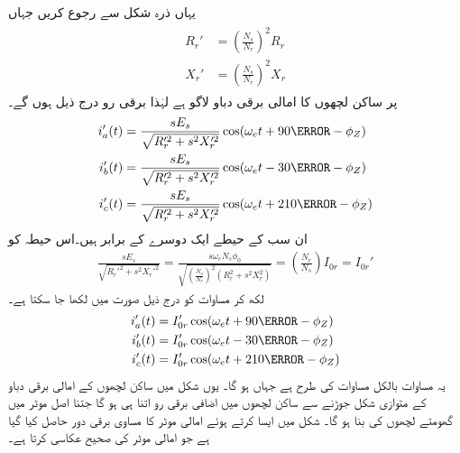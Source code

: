 یہاں ذرہ شکل   سے رجوع کریں جہاں 
\begin{gather}
\begin{aligned}\label{مساوات_امالی_گھومتے_مزاحمت_امالہ_دوسری_جانب}
R_r'&=\left(\frac{N_s}{N_r} \right)^2 R_r\\
X_r'&=\left(\frac{N_s}{N_r} \right)^2 X_r
\end{aligned}
\end{gather} 
پر ساکن لچھوں کا امالی برقی دباو  لاگو ہے لہٰذا  برقی رو درج ذیل ہوں گے۔
\begin{gather}
\begin{aligned}\label{مساوات_امالی_تین_رو}
i_a'(t)&=\frac{s E_s}{\sqrt{R_r'^2+s^2 X_r'^2}} \cos (\omega_e t +90\degree -\phi_Z)\\
i_b'(t)&=\frac{s E_s}{\sqrt{R_r'^2+s^2 X_r'^2}} \cos (\omega_e t -30\degree -\phi_Z)\\
i_c'(t)&=\frac{s E_s}{\sqrt{R_r'^2+s^2 X_r'^2}} \cos (\omega_e t +210\degree -\phi_Z)
\end{aligned}
\end{gather}
ان سب  کے حیطے ایک دوسرے کے برابر ہیں۔اس حیطہ کو 
\begin{align}\label{مساوات_امالی_رو_دباو_تعلق_الف}
\frac{s E_s}{\sqrt{R_r'^2+s^2 X_r'^2}}=\frac{s \omega_e N_s \phi_0}{\sqrt{\left( \frac{N_s}{N_r}\right)^2 \left(R_r^2+s^2X_r^2 \right)}}=\left(\frac{N_r}{N_s}\right) I_{0r}=I_{0r}'
\end{align}
لکھ کر مساوات   کو درج ذیل صورت میں لکھا جا سکتا ہے۔
\begin{gather}
\begin{aligned}
i_a'(t)&=I_{0r}' \cos (\omega_e t +90\degree -\phi_Z)\\
i_b'(t)&=I_{0r}' \cos (\omega_e t -30\degree -\phi_Z)\\
i_c'(t)&=I_{0r}' \cos (\omega_e t +210\degree -\phi_Z)
\end{aligned}
\end{gather}
یہ مساوات بالکل مساوات   کی طرح ہے جہاں  ہو گا۔ یوں شکل   میں ساکن لچھوں کے امالی برقی دباو  کے متوازی شکل   جوڑنے سے ساکن لچھوں میں  اضافی برقی رو  اتنا ہی ہو گا جتنا اصل موٹر میں گھومتے لچھوں کی بنا ہو گا۔ شکل   میں ایسا کرتے ہوئے امالی موٹر کا مساوی برقی دور حاصل کیا گیا ہے جو امالی موٹر  کی صحیح عکاسی کرتا ہے۔
